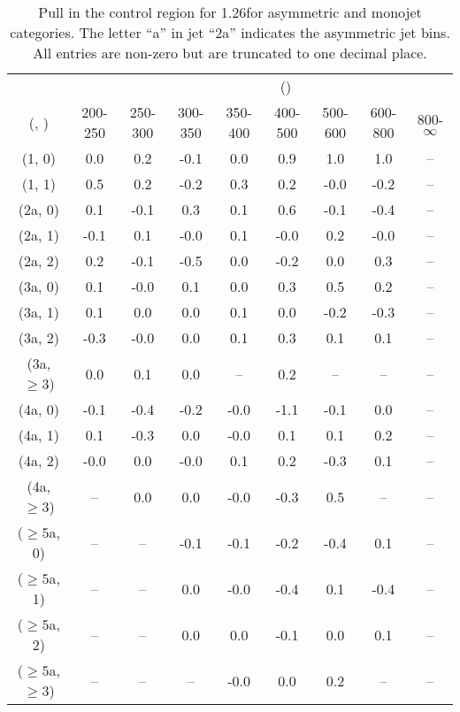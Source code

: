 \begin{table}[h!]
\tiny
\centering
\caption{Pull in the \mj control region for 1.26\ifb for asymmetric and monojet categories. The letter ``a'' in jet \eg ``2a''  indicates the asymmetric jet bins. All entries are non-zero but are truncated to one decimal place.\label{tab:pullsep_ewk_mu_asym}}
\begin{tabular}
{ccccccccc}
	\hline\hline
&	& \multicolumn{8}{c}{\scalht (\gev)} \\ 
	 (\njet,  \nb) & 200-250 & 250-300 & 300-350 & 350-400 & 400-500 & 500-600 & 600-800 & 800-$\infty$ \\ [0.8ex] 
\hline
	(1, 0) & 0.0 & 0.2 & -0.1 & 0.0 & 0.9 & 1.0 & 1.0 & -- \\[0.5ex] 
	(1, 1) & 0.5 & 0.2 & -0.2 & 0.3 & 0.2 & -0.0 & -0.2 & -- \\[0.5ex] 
	(2a, 0) & 0.1 & -0.1 & 0.3 & 0.1 & 0.6 & -0.1 & -0.4 & -- \\[0.5ex] 
	(2a, 1) & -0.1 & 0.1 & -0.0 & 0.1 & -0.0 & 0.2 & -0.0 & -- \\[0.5ex] 
	(2a, 2) & 0.2 & -0.1 & -0.5 & 0.0 & -0.2 & 0.0 & 0.3 & -- \\[0.5ex] 
	(3a, 0) & 0.1 & -0.0 & 0.1 & 0.0 & 0.3 & 0.5 & 0.2 & -- \\[0.5ex] 
	(3a, 1) & 0.1 & 0.0 & 0.0 & 0.1 & 0.0 & -0.2 & -0.3 & -- \\[0.5ex] 
	(3a, 2) & -0.3 & -0.0 & 0.0 & 0.1 & 0.3 & 0.1 & 0.1 & -- \\[0.5ex] 
	(3a, $\ge3$) & 0.0 & 0.1 & 0.0 & -- & 0.2 & -- & -- & -- \\[0.5ex] 
	(4a, 0) & -0.1 & -0.4 & -0.2 & -0.0 & -1.1 & -0.1 & 0.0 & -- \\[0.5ex] 
	(4a, 1) & 0.1 & -0.3 & 0.0 & -0.0 & 0.1 & 0.1 & 0.2 & -- \\[0.5ex] 
	(4a, 2) & -0.0 & 0.0 & -0.0 & 0.1 & 0.2 & -0.3 & 0.1 & -- \\[0.5ex] 
	(4a, $\ge3$) & -- & 0.0 & 0.0 & -0.0 & -0.3 & 0.5 & -- & -- \\[0.5ex] 
	($\ge5$a, 0) & -- & -- & -0.1 & -0.1 & -0.2 & -0.4 & 0.1 & -- \\[0.5ex] 
	($\ge5$a, 1) & -- & -- & 0.0 & -0.0 & -0.4 & 0.1 & -0.4 & -- \\[0.5ex] 
	($\ge5$a, 2) & -- & -- & 0.0 & 0.0 & -0.1 & 0.0 & 0.1 & -- \\[0.5ex] 
	($\ge5$a, $\ge3$) & -- & -- & -- & -0.0 & 0.0 & 0.2 & -- & -- \\[0.5ex] 
	\hline
	\hline
\end{tabular}
\end{table}
